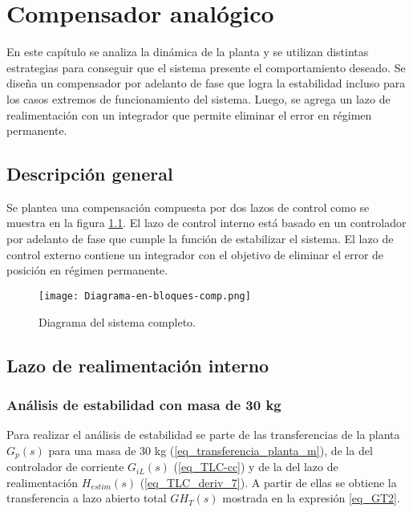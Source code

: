 \chapter{Compensador analógico}  \label{cap:Compensador Analogico}

En este capítulo se analiza la dinámica de la planta y se utilizan distintas estrategias para conseguir que el sistema presente el comportamiento deseado. Se diseña un compensador por adelanto de fase que logra la estabilidad incluso para los casos extremos de funcionamiento del sistema. Luego, se agrega un lazo de realimentación con un integrador que permite eliminar el error en régimen permanente.

\section{Descripción general}


\noindent Se plantea una compensación compuesta por dos lazos de control como se muestra en la figura \ref{fig:diag-en-bloques-comp}. El lazo de control interno está basado en un controlador por adelanto de fase que cumple la función de estabilizar el sistema. El lazo de control externo contiene un integrador con el objetivo de eliminar el error de posición en régimen permanente.


\begin{figure}[H]
	\centering
	\texttt{[image: Diagrama-en-bloques-comp.png]}
	\caption{Diagrama del sistema completo.}
	\label{fig:diag-en-bloques-comp}
\end{figure}

\section{Lazo de realimentación interno}

\subsection{Análisis de estabilidad con masa de 30 kg}

\noindent Para realizar el análisis de estabilidad se parte de las transferencias de la planta $G_{p}(s)$ para una masa de 30 kg (\ref{eq_transferencia_planta_m}), de la del controlador de corriente $G_{iL}(s)$ (\ref{eq_TLC-cc}) y de la del lazo de realimentación $H_{estim}(s)$ (\ref{eq_TLC_deriv_7}). A partir de ellas se obtiene  la transferencia a lazo abierto total $GH_T(s)$ mostrada en la expresión \ref{eq_GT2}.

